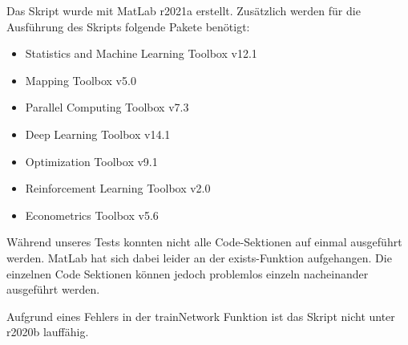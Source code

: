 \begin{titlepage}
{\begin{minipage}{0.6\textwidth}
      Das Skript wurde mit MatLab r2021a erstellt. Zusätzlich werden für die Ausführung des Skripts folgende Pakete benötigt:
      \begin{itemize}
        \item Statistics and Machine Learning Toolbox v12.1
        \item Mapping Toolbox v5.0
        \item Parallel Computing Toolbox v7.3
        \item Deep Learning Toolbox v14.1
        \item Optimization Toolbox v9.1
        \item Reinforcement Learning Toolbox v2.0
        \item Econometrics Toolbox v5.6
      \end{itemize}
      Während unseres Tests konnten nicht alle Code-Sektionen auf einmal ausgeführt werden. MatLab hat sich dabei leider an der exists-Funktion aufgehangen. Die einzelnen Code Sektionen können jedoch problemlos einzeln nacheinander ausgeführt werden.
      
      Aufgrund eines Fehlers in der trainNetwork Funktion ist das Skript nicht unter r2020b lauffähig.
  \end{minipage}
  }

  \end{titlepage}
 
  \newpage
  \tableofcontents
